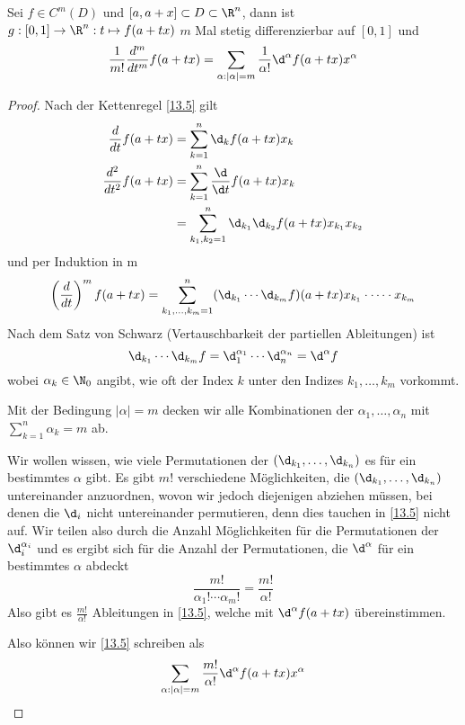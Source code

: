 \documentclass[a4paper,10pt]{scrartcl}
\begin{document}
\begin{lem}
\label{13.15}
Sei $f\in C^m(D)$ und $[a,a+x]\subset D\subset \R^n$, dann ist $g:[0,1]\to \R^n:t\mapsto f(a+tx)$ $m$ Mal stetig differenzierbar auf $[0,1]$ und
\[
\frac 1{m!}\frac {d^m}{dt^m} f(a+tx) = \sum_{\alpha:|\alpha|= m}\frac 1{\alpha!}\d^{\alpha}f(a+tx)x^{\alpha}
\]

\begin{proof}
Nach der Kettenregel \ref{13.5} gilt
\begin{align*}
\frac d{dt}f(a+tx) &= \sum_{k=1}^n \d_kf(a+tx)x_k\\
\frac{d^2}{dt^2}f(a+tx) &= \sum_{k=1}^n \frac {\d}{\d t}f(a+tx)x_k\\
						&=\sum_{k_1,k_2=1}^n \d_{k_1}\d_{k_2}f(a+tx)x_{k_1}x_{k_2}
\end{align*}
und per Induktion in m
\begin{align}
\label{13.5}
\left(\frac{d}{dt}\right)^m f(a+tx) = \sum_{k_1,\dotsc,k_m=1}^n(\d_{k_1}\dotsb\d_{k_m}f)(a+tx)x_{k_1}\cdot\dotsb\cdot x_{k_m}
\end{align}
Nach dem Satz von Schwarz (Vertauschbarkeit der partiellen Ableitungen) ist
\[
\d_{k_1}\dotsb \d_{k_m} f = \d_1^{\alpha_1}\dotsb \d_n^{\alpha_n} = \d^\alpha f
\]
wobei $\alpha_k\in \N_0$ angibt, wie oft der Index $k$ unter den Indizes $k_1,\dotsc,k_m$ vorkommt.

Mit der Bedingung $|\alpha|=m$ decken wir alle Kombinationen der $\alpha_1,\dotsc,\alpha_n$ mit $\sum_{k=1}^n \alpha_k = m$ ab.

Wir wollen wissen, wie viele Permutationen der $(\d_{k_1},\dotsc,\d_{k_n})$ es für ein bestimmtes $\alpha$ gibt.
Es gibt $m!$ verschiedene Möglichkeiten, die $(\d_{k_1},\dotsc,\d_{k_n})$ untereinander anzuordnen, wovon wir jedoch diejenigen abziehen müssen, bei denen die $\d_i$ nicht untereinander permutieren, denn dies tauchen in \eqref{13.5} nicht auf.
Wir teilen also durch die Anzahl Möglichkeiten für die Permutationen der $\d_i^{\alpha_i}$ und es ergibt sich für die Anzahl der Permutationen, die $\d^\alpha$ für ein bestimmtes $\alpha$ abdeckt
\[
\frac {m!}{\alpha_1!\dotsb\alpha_m!} = \frac {m!}{\alpha!}
\]
Also gibt es $\frac{m!}{\alpha!}$ Ableitungen in \eqref{13.5}, welche mit $\d^{\alpha}f(a+tx)$ übereinstimmen.

Also können wir \eqref{13.5} schreiben als
\[
\sum_{\alpha:|\alpha|=m} \frac{m!}{\alpha!} \d^{\alpha}f(a+tx)x^{\alpha}
\]
\end{proof}
\end{lem}
\end{document}
